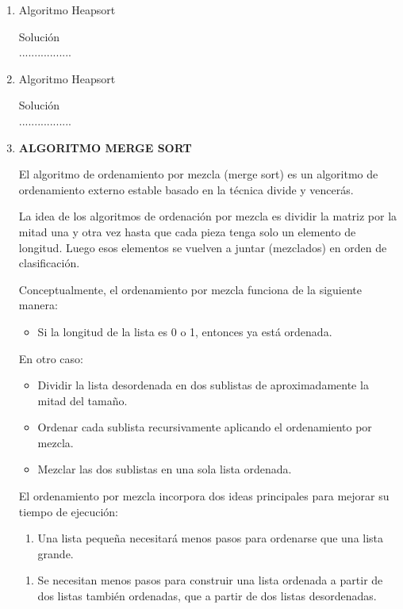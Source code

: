 \documentclass{article}
\begin{document}
\begin{enumerate}
		\item Algoritmo Heapsort
		
		Solución \\
		.................
\item Algoritmo Heapsort
		
		Solución \\
		.................

        \item \textbf{ALGORITMO MERGE SORT}
        
		 El algoritmo de ordenamiento por mezcla (merge sort) es un algoritmo de ordenamiento externo estable basado en la técnica divide y vencerás.
		 
        La idea de los algoritmos de ordenación por mezcla es dividir la matriz por la mitad una y otra vez hasta que cada pieza tenga solo un elemento de longitud. Luego esos elementos se vuelven a juntar (mezclados) en orden de clasificación.
        
        Conceptualmente, el ordenamiento por mezcla funciona de la siguiente manera: 
        \begin{itemize}
            \item Si la longitud de la lista es 0 o 1, entonces ya está ordenada.
        \end{itemize}
    
        En otro caso: 
        \begin{itemize}
            \item Dividir la lista desordenada en dos sublistas de aproximadamente la mitad del tamaño. 
            \item Ordenar cada sublista recursivamente aplicando el ordenamiento por mezcla. 
            \item Mezclar las dos sublistas en una sola lista ordenada.
        \end{itemize}

        El ordenamiento por mezcla incorpora dos ideas principales para mejorar su tiempo de ejecución:
        \begin{enumerate}
            \item Una lista pequeña necesitará menos pasos para ordenarse que una lista grande.
        \end{enumerate}
        \begin{enumerate}
            \item Se necesitan menos pasos para construir una lista ordenada a partir de dos listas también ordenadas, que a partir de dos listas desordenadas.
        \end{enumerate}
    

\end{enumerate}
\end{document}
